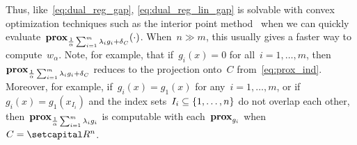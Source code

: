 \documentclass[../../main]{subfiles}
\begin{document}
                        Thus, like~\cref{eq:dual_reg_gap}, \cref{eq:dual_reg_lin_gap} is solvable with convex optimization techniques such as the interior point method~\cite{Bertsekas1999} when we can quickly evaluate~$\prox_{\frac{1}{\alpha} \sum_{i = 1}^{m} \lambda_i g_i + \indicator_C}(\cdot)$.
                        When~$n \gg m$, this usually gives a faster way to compute~$w_\alpha$.
                        Note, for example, that if~$g_i(x) = 0$ for all~$i = 1, \dots, m$, then~$\prox_{\frac{1}{\alpha} \sum_{i = 1}^{m} \lambda_i g_i + \indicator_C}$ reduces to the projection onto~$C$ from~\cref{eq:prox_ind}.
                        Moreover, for example, if~$g_i(x) = g_1(x)$ for any~$i = 1, \dots, m$, or if~$g_i(x) = g_1(x_{I_i})$ and the index sets~$I_i \subseteq \set*{1, \dots, n}$ do not overlap each other, then~$\prox_{\frac{1}{\alpha} \sum_{i = 1}^{m} \lambda_i g_i}$ is computable with each~$\prox_{g_i}$ when~$C = \setR^n$.
\end{document}
